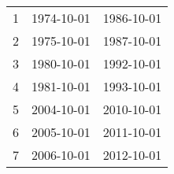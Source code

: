 % 
\begin{tabular}{ccc}
  \hline
  \hline
1 & 1974-10-01 & 1986-10-01 \\ 
  2 & 1975-10-01 & 1987-10-01 \\ 
  3 & 1980-10-01 & 1992-10-01 \\ 
  4 & 1981-10-01 & 1993-10-01 \\ 
  5 & 2004-10-01 & 2010-10-01 \\ 
  6 & 2005-10-01 & 2011-10-01 \\ 
  7 & 2006-10-01 & 2012-10-01 \\ 
   \hline
\end{tabular}
